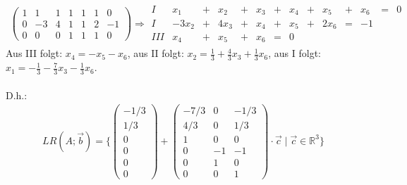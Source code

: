 \documentclass[titlepage]{article}
\newcommand{\R}{\mathbb{R}}
\begin{document}
	\begin{align*}
		\left(\begin{array}{cccccc|c}
			1&1&1&1&1&1&0\\
			0&-3&4&1&1&2&-1\\
			0&0&0&1&1&1&0
		\end{array}\right)
		\Rightarrow
		\begin{array}{cccccccccccccc}
			I&x_1&+&x_2&+&x_3&+&x_4&+&x_5&+&x_6&=&0\\
			I&-3x_2&+&4x_3&+&x_4&+&x_5&+&2x_6&=&-1\\
			III&x_4&+&x_5&+&x_6&=&0
		\end{array}
	\end{align*}
	Aus III folgt: $x_4=-x_5-x_6$, aus II folgt: $x_2=\frac{1}{3}+\frac{4}{3}x_3+\frac{1}{3}x_6$, aus I folgt: $x_1=-\frac{1}{3}-\frac{7}{3}x_3-\frac{1}{3}x_6$.\\\\
	D.h.:
	\begin{align*}
		LR(A;\vec{b})=\{\begin{pmatrix}
			-1/3\\1/3\\0\\0\\0\\0
		\end{pmatrix}+\begin{pmatrix}
		-7/3&0&-1/3\\
		4/3&0&1/3\\
		1&0&0\\
		0&-1&-1\\
		0&1&0\\
		0&0&1
	\end{pmatrix}\cdot\vec{c}\mid\vec{c}\in\R^3\}
	\end{align*}
\end{document}

